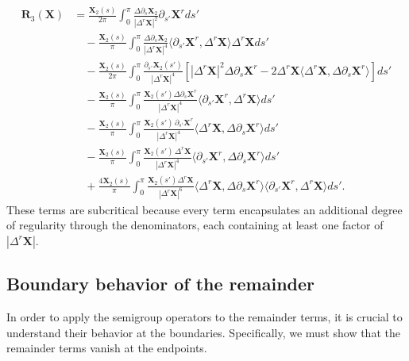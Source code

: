 \documentclass{amsart}
\begin{document}
\begin{equation}\label{e:R3expanded}
\begin{split}
     \mathbf{R}_3(\mathbf{X})  
& =  \frac{\mathbf{X}_2(s)}{2\pi} \int_0^\pi \frac{\Delta \partial_s \mathbf{X}_2 }{ |\Delta^r \mathbf{X}|^2}  \partial_{s'} \mathbf{X}^r ds' \\
& \quad - \frac{\mathbf{X}_2(s)}{ \pi} \int_0^\pi \frac{ \Delta \partial_s \mathbf{X}_2 }{ |\Delta^r \mathbf{X}|^4} \langle \partial_{s'} \mathbf{X}^r, \Delta^r \mathbf{X} \rangle \Delta^r \mathbf{X} ds'  \\
& \quad - \frac{\mathbf{X}_2(s) }{2\pi} \int_0^\pi \frac{ \partial_{s'} \mathbf{X}_2(s') }{  |\Delta^r \mathbf{X}|^4}  
\left[ |\Delta^r \mathbf{X}|^2 \Delta \partial_s \mathbf{X}^r - 2 \Delta^r \mathbf{X} \langle \Delta^r \mathbf{X}, \Delta \partial_s \mathbf{X}^r \rangle\right]  ds' \\
& \quad - \frac{\mathbf{X}_2(s)  }{ \pi} \int_0^\pi \frac{  \mathbf{X}_2(s') \Delta \partial_s \mathbf{X}^r }{  |\Delta^r \mathbf{X}|^4}  \langle \partial_{s'} \mathbf{X}^r , \Delta^r \mathbf{X} \rangle ds'\\
& \quad - \frac{\mathbf{X}_2(s)  }{ \pi} \int_0^\pi \frac{  \mathbf{X}_2(s') \,\partial_{s'} \mathbf{X}^r }{  |\Delta^r \mathbf{X}|^4}  \langle \Delta^r \mathbf{X} , \Delta \partial_s \mathbf{X}^r \rangle  ds'\\
& \quad - \frac{\mathbf{X}_2(s)  }{ \pi} \int_0^\pi \frac{  \mathbf{X}_2(s')\, \Delta^r \mathbf{X}}{  |\Delta^r \mathbf{X}|^4}  \langle \partial_{s'} \mathbf{X}^r , \Delta \partial_s \mathbf{X}^r \rangle  ds'\\
& \quad + \frac{4 \mathbf{X}_2(s)  }{ \pi} \int_0^\pi \frac{  \mathbf{X}_2(s') \Delta^r \mathbf{X} }{  |\Delta^r \mathbf{X}|^6}  \langle \Delta^r \mathbf{X} , \Delta \partial_s \mathbf{X}^r \rangle \langle \partial_{s'} \mathbf{X}^r, \Delta^r \mathbf{X} \rangle ds'.
\end{split}
\end{equation}
These terms are subcritical because every term encapsulates an additional degree of regularity through the denominators, each containing at least one factor of $|\Delta^r \mathbf{X}|$.

\subsection{Boundary behavior of the remainder}

In order to apply the semigroup operators to the remainder terms, it is crucial to understand their behavior at the boundaries. Specifically, we must show that the remainder terms vanish at the endpoints. 
\end{document}
